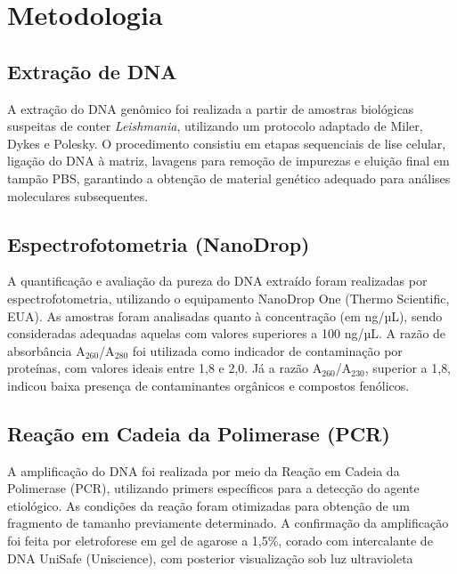 \section{Metodologia}

\subsection{Extração de DNA}

A extração do DNA genômico foi realizada a partir de amostras biológicas
suspeitas de conter \textit{Leishmania}, utilizando um protocolo adaptado de
Miler, Dykes e Polesky\cite{SODEmiller1988}.  O procedimento consistiu em
etapas sequenciais de lise celular, ligação do DNA à matriz, lavagens para
remoção de impurezas e eluição final em tampão PBS, garantindo a obtenção de
material genético adequado para análises moleculares subsequentes.

\subsection{Espectrofotometria (NanoDrop)}

A quantificação e avaliação da pureza do DNA extraído foram realizadas por
espectrofotometria, utilizando o equipamento NanoDrop One (Thermo Scientific,
EUA). As amostras foram analisadas quanto à concentração (em ng/µL), sendo
consideradas adequadas aquelas com valores superiores a 100 ng/µL. A razão de
absorbância A$_{260}$/A$_{280}$ foi utilizada como indicador de contaminação por
proteínas, com valores ideais entre 1{,}8 e 2{,}0. Já a razão
A$_{260}$/A$_{230}$, superior a 1{,}8, indicou baixa presença de contaminantes
orgânicos e compostos fenólicos.

\subsection{Reação em Cadeia da Polimerase (PCR)}

A amplificação do DNA foi realizada por meio da Reação em Cadeia da Polimerase
(PCR), utilizando primers específicos para a detecção do agente etiológico. As
condições da reação foram otimizadas para obtenção de um fragmento de tamanho
previamente determinado. A confirmação da amplificação foi feita por
eletroforese em gel de agarose a 1,5\%, corado com intercalante de DNA UniSafe
(Uniscience), com posterior visualização sob luz ultravioleta

